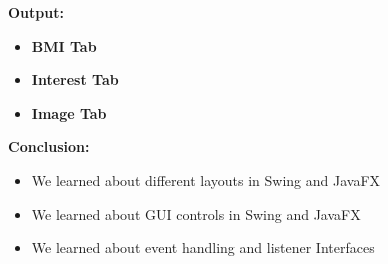 \documentclass{book}
\begin{document}
{\begin{enumerate}
\begin{verbatim}
    \end{verbatim}
    \par
    \textbf{Output:}
    \begin{itemize} 
        \item { \textbf{BMI Tab}
        }
        \item{ \textbf{Interest Tab}
        }
        \item{ \textbf{Image Tab}
        }
    \end{itemize}
    \end{enumerate}
    \par
    \textbf{Conclusion:}
    \begin{itemize}
        \item We learned about different layouts in Swing and JavaFX
        \item We learned about GUI controls in Swing and JavaFX
        \item We learned about event handling and listener Interfaces
    \end{itemize}
}
\end{document}
